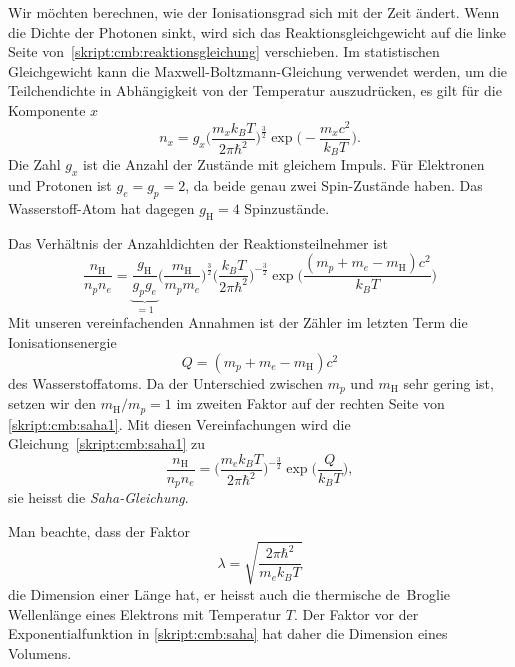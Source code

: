 Wir möchten berechnen, wie der Ionisationsgrad sich mit der Zeit ändert.
Wenn die Dichte der Photonen sinkt, wird sich das Reaktionsgleichgewicht
auf die linke Seite von~\eqref{skript:cmb:reaktionsgleichung} verschieben.
Im statistischen Gleichgewicht kann die Maxwell-Boltzmann-Gleichung
verwendet werden, um die Teilchendichte in Abhängigkeit von der Temperatur
auszudrücken, es gilt für die Komponente $x$
\[
n_x
=
g_x \biggl(\frac{m_xk_BT}{2\pi \hbar^2}\biggr)^{\frac32}
\exp\biggl(-\frac{m_xc^2}{k_BT}\biggr).
\]
Die Zahl $g_x$ ist die Anzahl der Zustände mit gleichem Impuls.
Für Elektronen und Protonen ist $g_e=g_p=2$, da beide genau zwei
Spin-Zustände haben.
Das Wasserstoff-Atom hat dagegen $g_\text{H}=4$ Spinzustände.

Das Verhältnis der Anzahldichten der Reaktionsteilnehmer ist
\begin{equation}
\frac{n_\text{H}}{n_pn_e}
=
\underbrace{\frac{g_\text{H}}{g_pg_e}}_{\displaystyle=1}
\biggl(\frac{m_\text{H}}{m_pm_e}\biggr)^{\frac32}
\biggl(\frac{k_BT}{2\pi \hbar^2}\biggr)^{-\frac32}
\exp\biggl( \frac{(m_p+m_e-m_\text{H})c^2}{k_BT} \biggr)
\label{skript:cmb:saha1}
\end{equation}
Mit unseren vereinfachenden Annahmen ist der Zähler im letzten Term
die Ionisationsenergie
\[
Q=(m_p+m_e-m_\text{H})c^2
\]
des Wasserstoffatoms.
Da der Unterschied zwischen $m_p$ und $m_\text{H}$ sehr gering ist,
setzen wir den $m_\text{H}/m_p=1$ im zweiten Faktor auf der rechten Seite
von \eqref{skript:cmb:saha1}.
Mit diesen Vereinfachungen wird die Gleichung~\eqref{skript:cmb:saha1}
zu
\begin{equation}
\frac{n_\text{H}}{n_pn_e}
=
\biggl(\frac{m_ek_BT}{2\pi \hbar^2}\biggr)^{-\frac32}
\exp\biggl( \frac{Q}{k_BT} \biggr),
\label{skript:cmb:saha}
\end{equation}
sie heisst die {\em Saha-Gleichung}.
%

Man beachte, dass der Faktor
\[
\lambda
=
\sqrt{\frac{2\pi\hbar^2}{m_ek_BT}}
\]
die Dimension einer Länge hat, er heisst auch die thermische de~Broglie
Wellenlänge eines Elektrons mit Temperatur $T$.
Der Faktor vor der Exponentialfunktion in \eqref{skript:cmb:saha}
hat daher die Dimension eines Volumens.

